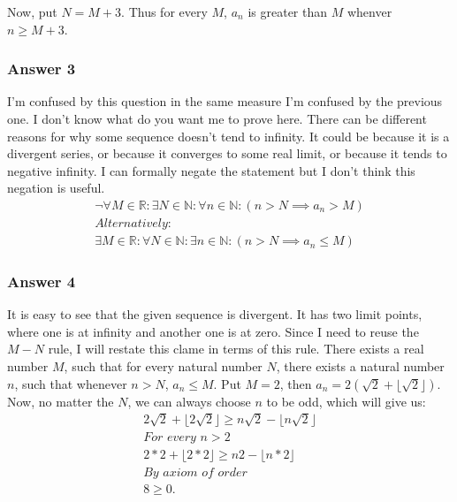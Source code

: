 \documentclass[11pt]{article}
\begin{document}
Now, put $N = M + 3$. Thus for every $M$, $a_n$ is greater than $M$ whenver
$n \geq M + 3$.
\subsubsection{Answer 3}
\label{sec-1-1-3}
I'm confused by this question in the same measure I'm confused by the previous
one.  I don't know what do you want me to prove here.  There can be different
reasons for why some sequence doesn't tend to infinity.  It could be because
it is a divergent series, or because it converges to some real limit, or
because it tends to negative infinity.  I can formally negate the statement
but I don't think this negation is useful.
\begin{equation*}
  \begin{aligned}
    \lnot \forall M \in \mathbb{R} : \exists N \in \mathbb{N} :
    \forall n \in \mathbb{N} : (n > N \implies a_n > M) \\
    \textit{Alternatively:} \\
    \exists M \in \mathbb{R} : \forall N \in \mathbb{N} :
    \exists n \in \mathbb{N} : (n > N \implies a_n \leq M)
  \end{aligned}
\end{equation*}
\subsubsection{Answer 4}
\label{sec-1-1-4}
It is easy to see that the given sequence is divergent.  It has two limit
points, where one is at infinity and another one is at zero.  Since I need
to reuse the $M-N$ rule, I will restate this clame in terms of this rule.
There exists a real number $M$, such that for every natural number $N$,
there exists a natural number $n$, such that whenever $n > N$, $a_n \leq M$.
Put $M = 2$, then $a_n = 2(\sqrt{2} + \lfloor \sqrt{2} \rfloor)$.  Now, no matter
the $N$, we can always choose $n$ to be odd, which will give us:
\begin{equation*}
  \begin{aligned}
    2\sqrt{2} + \lfloor 2\sqrt{2} \rfloor \geq n\sqrt{2} - \lfloor n\sqrt{2} \rfloor \\
    \textit{For every $n > 2$} \\
    2 * 2 + \lfloor 2 * 2 \rfloor \geq n 2 - \lfloor n * 2 \rfloor \\
    \textit{By axiom of order} \\
    8 \geq 0.
  \end{aligned}
\end{equation*}
\end{document}
